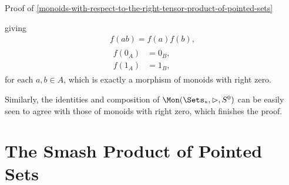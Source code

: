 \begin{Proof}{Proof of \cref{monoids-with-respect-to-the-right-tensor-product-of-pointed-sets}}
\begin{webcompile}
    \end{webcompile}
    giving
    \begin{gather*}
        f(ab)    = f(a)f(b),\\
        \begin{aligned}
            f(0_{A}) &= 0_{B},\\
            f(1_{A}) &= 1_{B},
        \end{aligned}
    \end{gather*}
    for each $a,b\in A$, which is exactly a morphism of monoids with right zero.

    Similarly, the identities and composition of $\Mon(\Sets_{*},\rhd,S^{0})$ can be easily seen to agree with those of monoids with right zero, which finishes the proof.
\end{Proof}
\section{The Smash Product of Pointed Sets}\label{section-the-smash-product-of-pointed-sets}
